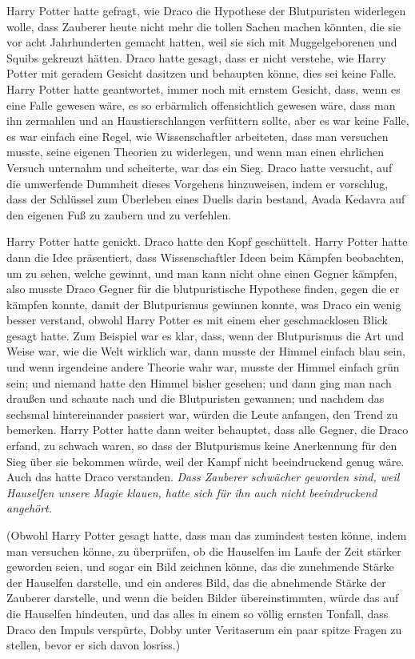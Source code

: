 Harry Potter hatte gefragt, wie Draco die Hypothese der Blutpuristen widerlegen
wolle, dass Zauberer heute nicht mehr die tollen Sachen machen könnten, die sie
vor acht Jahrhunderten gemacht hatten, weil sie sich mit Muggelgeborenen und
Squibs gekreuzt hätten. Draco hatte gesagt, dass er nicht verstehe, wie Harry
Potter mit geradem Gesicht dasitzen und behaupten könne, dies sei keine Falle.
Harry Potter hatte geantwortet, immer noch mit ernstem Gesicht, dass, wenn es
eine Falle gewesen wäre, es so erbärmlich offensichtlich gewesen wäre, dass man
ihn zermahlen und an Haustierschlangen verfüttern sollte, aber es war keine
Falle, es war einfach eine Regel, wie Wissenschaftler arbeiteten, dass man
versuchen musste, seine eigenen Theorien zu widerlegen, und wenn man einen
ehrlichen Versuch unternahm und scheiterte, war das ein Sieg. Draco hatte
versucht, auf die umwerfende Dummheit dieses Vorgehens hinzuweisen, indem er
vorschlug, dass der Schlüssel zum Überleben eines Duells darin bestand, Avada
Kedavra auf den eigenen Fuß zu zaubern und zu verfehlen.

Harry Potter hatte genickt. Draco hatte den Kopf geschüttelt. Harry Potter hatte
dann die Idee präsentiert, dass Wissenschaftler Ideen beim Kämpfen beobachten,
um zu sehen, welche gewinnt, und man kann nicht ohne einen Gegner kämpfen, also
musste Draco Gegner für die blutpuristische Hypothese finden, gegen die er
kämpfen konnte, damit der Blutpurismus gewinnen konnte, was Draco ein wenig
besser verstand, obwohl Harry Potter es mit einem eher geschmacklosen Blick
gesagt hatte. Zum Beispiel war es klar, dass, wenn der Blutpurismus die Art und
Weise war, wie die Welt wirklich war, dann musste der Himmel einfach blau sein,
und wenn irgendeine andere Theorie wahr war, musste der Himmel einfach grün
sein; und niemand hatte den Himmel bisher gesehen; und dann ging man nach
draußen und schaute nach und die Blutpuristen gewannen; und nachdem das sechsmal
hintereinander passiert war, würden die Leute anfangen, den Trend zu bemerken.
Harry Potter hatte dann weiter behauptet, dass alle Gegner, die Draco erfand, zu
schwach waren, so dass der Blutpurismus keine Anerkennung für den Sieg über sie
bekommen würde, weil der Kampf nicht beeindruckend genug wäre. Auch das hatte
Draco verstanden. \emph{Dass Zauberer schwächer geworden sind, weil Hauselfen
unsere Magie klauen, hatte sich für ihn auch nicht beeindruckend angehört.}

(Obwohl Harry Potter gesagt hatte, dass man das zumindest testen könne, indem
man versuchen könne, zu überprüfen, ob die Hauselfen im Laufe der Zeit stärker
geworden seien, und sogar ein Bild zeichnen könne, das die zunehmende Stärke der
Hauselfen darstelle, und ein anderes Bild, das die abnehmende Stärke der
Zauberer darstelle, und wenn die beiden Bilder übereinstimmten, würde das auf
die Hauselfen hindeuten, und das alles in einem so völlig ernsten Tonfall, dass
Draco den Impuls verspürte, Dobby unter Veritaserum ein paar spitze Fragen zu
stellen, bevor er sich davon losriss.)

